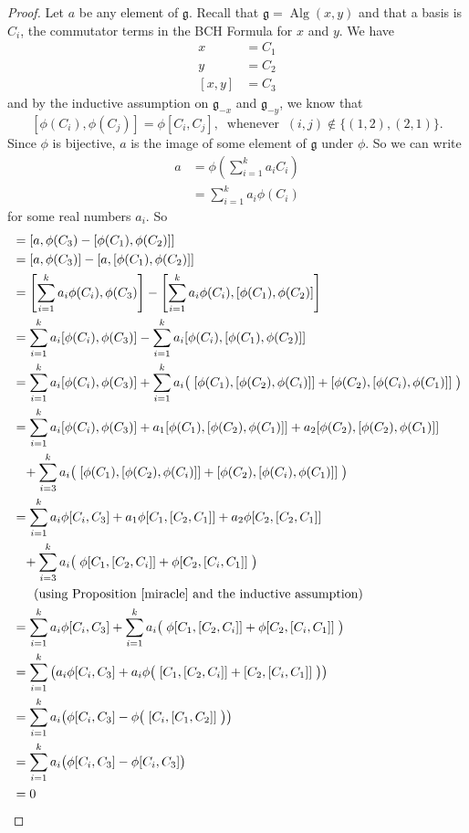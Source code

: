 \documentclass[honours]{UNSWthesis}
\newcommand{\g}{\mathfrak{g}}
\newcommand{\1}{\mathbf{e}_{1}}
\newcommand{\2}{\mathbf{e}_{3}}
\newcommand{\3}{\mathbf{e}_{3}}
\DeclareMathOperator{\alg}{Alg}
\begin{document}
\begin{proof}
Let $a$ be any element of $\g$. Recall that $\g = \alg(x,y)$ and that a basis is $C_{i}$, the commutator terms in the BCH Formula for $x$ and $y$. We have 
\begin{align*}
x&=C_{1}\\
y&=C_{2}\\
[x,y]&=C_{3}
\end{align*}
and by the inductive assumption on $\g_{-x}$ and $\g_{-y}$, we know that 
\[
[\phi(C_{i}),\phi(C_{j})]=\phi[C_{i},C_{j}],\;\;\text{whenever}\;\; (i,j) \notin \{(1,2),(2,1)\}.
\]
Since $\phi$ is bijective, $a$ is the image of some element of $\g$ under $\phi$. So we can write 
\begin{align*}
a &=\phi(\sum\limits_{i=1}^{k}a_{i}C_{i})\\
&=\sum\limits_{i=1}^{k} a_{i}\phi(C_{i})
\end{align*}
for some real numbers $a_{i}$.\newline
So
\begin{align*}
[a,z] &= [a,\phi(C_{3})-[\phi(C_{1}),\phi(C_{2})]] \\
&=[a,\phi(C_{3})]-[a,[\phi(C_{1}),\phi(C_{2})]] \\
&=\left[\sum\limits_{i=1}^{k} a_{i}\phi(C_{i}),\phi(C_{3}) \right]-\left[ \sum\limits_{i=1}^{k} a_{i}\phi(C_{i}),[\phi(C_{1}),\phi(C_{2})]\right] \\
&=\sum\limits_{i=1}^{k} a_{i}[\phi(C_{i}),\phi(C_{3})]-\sum\limits_{i=1}^{k} a_{i}[\phi(C_{i}),[\phi(C_{1}),\phi(C_{2})]] \\
&=\sum\limits_{i=1}^{k} a_{i}[\phi(C_{i}),\phi(C_{3})]+ \sum\limits_{i=1}^{k} a_{i}\big(\; [\phi(C_{1}),[\phi(C_{2}),\phi(C_{i})]]+[\phi(C_{2}),[\phi(C_{i}),\phi(C_{1})]]\;\big) \\
&=\sum\limits_{i=1}^{k} a_{i}[\phi(C_{i}),\phi(C_{3})]+a_{1}[\phi(C_{1}),[\phi(C_{2}),\phi(C_{1})]]+a_{2}[\phi(C_{2}),[\phi(C_{2}),\phi(C_{1})]] \\
&\;\;\;+ \sum\limits_{i=3}^{k} a_{i}\big(\; [\phi(C_{1}),[\phi(C_{2}),\phi(C_{i})]]+[\phi(C_{2}),[\phi(C_{i}),\phi(C_{1})]] \;\big) \\
&=\sum\limits_{i=1}^{k} a_{i}\phi[C_{i},C_{3}]+a_{1}\phi[C_{1},[C_{2},C_{1}]]+a_{2}\phi[C_{2},[C_{2},C_{1}]] \\
&\;\;\;+ \sum\limits_{i=3}^{k} a_{i}\big(\; \phi[C_{1},[C_{2},C_{i}]]+\phi[C_{2},[C_{i},C_{1}]] \;\big) \\
& \;\;\;\;\;\; \text{(using Proposition \ref{miracle} and the inductive assumption) } \\
&=\sum\limits_{i=1}^{k} a_{i}\phi[C_{i},C_{3}]+ \sum\limits_{i=1}^{k} a_{i}\big(\; \phi[C_{1},[C_{2},C_{i}]]+\phi[C_{2},[C_{i},C_{1}]] \;\big) \\
&=\sum\limits_{i=1}^{k} \big( a_{i}\phi[C_{i},C_{3}]+ a_{i}\phi\big(\; [C_{1},[C_{2},C_{i}]]+[C_{2},[C_{i},C_{1}]] \;\big)\big) \\
&=\sum\limits_{i=1}^{k} a_{i}\big(\phi[C_{i},C_{3}]- \phi\big(\; [C_{i},[C_{1},C_{2}]] \;\big)\big) \\
&=\sum\limits_{i=1}^{k} a_{i}\big(\phi[C_{i},C_{3}]- \phi[C_{i},C_{3}] \big) \\
&=0
\end{align*}


\end{proof}
\end{document}

